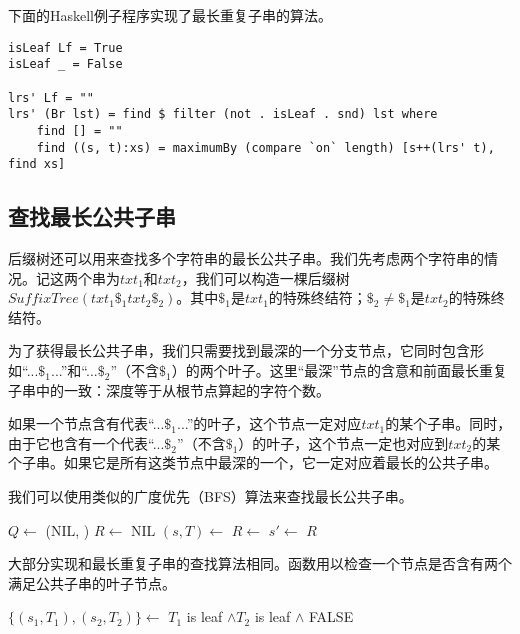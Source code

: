 \documentclass{ctexart}
\begin{document}
下面的Haskell例子程序实现了最长重复子串的算法。

\lstset{language=Haskell}
\begin{lstlisting}[style=Haskell]
isLeaf Lf = True
isLeaf _ = False

lrs' Lf = ""
lrs' (Br lst) = find $ filter (not . isLeaf . snd) lst where
    find [] = ""
    find ((s, t):xs) = maximumBy (compare `on` length) [s++(lrs' t), find xs]
\end{lstlisting} %

\subsection{查找最长公共子串}

后缀树还可以用来查找多个字符串的最长公共子串。我们先考虑两个字符串的情况。记这两个串为$txt_1$和$txt_2$，我们可以构造一棵后缀树$SuffixTree(txt_1\$_1txt_2\$_2)$。其中$\$_1$是$txt_1$的特殊终结符；$\$_2 \neq \$_1$是$txt_2$的特殊终结符。

为了获得最长公共子串，我们只需要找到最深的一个分支节点，它同时包含形如“...$\$_1$...”和“...$\$_2$”（不含$\$_1$）的两个叶子。这里“最深”节点的含意和前面最长重复子串中的一致：深度等于从根节点算起的字符个数。

如果一个节点含有代表“...$\$_1$...”的叶子，这个节点一定对应$txt_1$的某个子串。同时，由于它也含有一个代表“...$\$_2$”（不含$\$_1$）的叶子，这个节点一定也对应到$txt_2$的某个子串。如果它是所有这类节点中最深的一个，它一定对应着最长的公共子串。

我们可以使用类似的广度优先（BFS）算法来查找最长公共子串。

\begin{algorithmic}[1]
  \State $Q \gets$ (NIL, )
  \State $R \gets$ NIL
    \State $(s, T) \gets$ 
      \State $R \gets$ 
    \EndIf
        \State $s' \gets$ 
        \State {}
      \EndIf
    \EndFor
  \EndWhile
  \State \Return $R$
\EndFunction
\end{algorithmic}

大部分实现和最长重复子串的查找算法相同。函数用以检查一个节点是否含有两个满足公共子串的叶子节点。

\begin{algorithmic}[1]
    \State $\{(s_1, T_1), (s_2, T_2)\} \gets$ 
    \State \Return $T_1$ is leaf $\land T_2$ is leaf $\land$ 
  \EndIf
  \State \Return FALSE
\EndFunction
\end{algorithmic}
\end{document}
